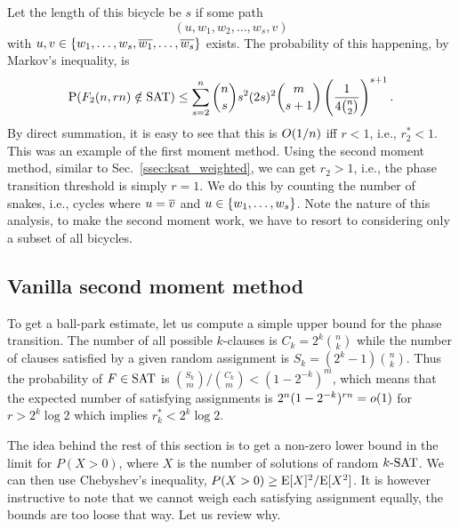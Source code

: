 \documentclass[letterpaper, 10pt, twocolumn, reqno]{amsart}
\begin{document}
Let the length of this bicycle be $s$ if some path
$$(u, w_1, w_2, \ldots, w_s, v)$$
with $u,v \in \{w_1, \ldots, w_s,\overline{w_1}, \ldots, \overline{w_s}\}$
exists. The probability of this happening, by Markov's inequality, is
$$
\textrm{P}(F_2(n,rn) \notin \textrm{SAT}) \leq \sum_{s=2}^n \binom{n}{s} s^2 (2s)^2 \binom{m}{s+1} \left(\frac{1}{4 \binom{n}{2}}\right)^{s+1}.
$$
By direct summation, it is easy to see that this is $O(1/n)$ iff $r <1$, i.e., $r_2^* < 1$. This was an example of the first moment method. Using the second moment method, similar to Sec.~\ref{ssec:ksat_weighted}, we can get $r_2 > 1$, i.e., the phase transition threshold is simply $r = 1$. We do this by counting the number of snakes, i.e., cycles where $u = \overline{v}$ and $u \in \left\{w_1, \ldots, w_s\right\}$. Note the nature of this analysis, to make the second moment work, we have to resort to considering only a subset of all bicycles.

\subsection{Vanilla second moment method}
\label{ssec:ksat_vanilla}
To get a ball-park estimate, let us compute a simple upper bound for the phase
transition. The number of all possible $k$-clauses is $C_k = 2^k \binom{n}{k}$
 while the number of clauses satisfied by a given random assignment is $S_k = (2^k -1) \binom{n}{k}$. Thus the probability of $F \in \textrm{SAT}$ is $\binom{S_k}{m}/\binom{C_k}{m} < (1-2^{-k})^m$, which means that the expected number of
satisfying assignments is $2^n (1-2^{-k})^{rn} = o(1)$ for $r > 2^k \log 2$ which implies $r_k^* < 2^k \log 2$.

The idea behind the rest of this section is to get a non-zero lower bound in the limit for $P(X > 0)$, where $X$ is the number of solutions of random $k\textrm{-SAT}$. We can then use Chebyshev's inequality, $P(X>0) \geq \textrm{E}[X]^2/\textrm{E}[X^2]$. It is however instructive to note that we cannot weigh each satisfying assignment equally, the bounds are too loose that way. Let us review why.
\end{document}
